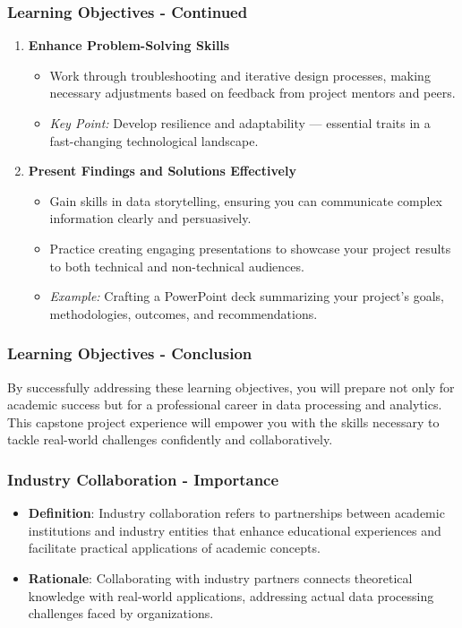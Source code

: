 \documentclass{beamer}
\begin{document}
\begin{frame}[fragile]
    \frametitle{Learning Objectives - Continued}
    \begin{enumerate}[resume]
        \item \textbf{Enhance Problem-Solving Skills}
            \begin{itemize}
                \item Work through troubleshooting and iterative design processes, making necessary adjustments based on feedback from project mentors and peers.
                \item \textit{Key Point:} Develop resilience and adaptability — essential traits in a fast-changing technological landscape.
            \end{itemize}
        \item \textbf{Present Findings and Solutions Effectively}
            \begin{itemize}
                \item Gain skills in data storytelling, ensuring you can communicate complex information clearly and persuasively.
                \item Practice creating engaging presentations to showcase your project results to both technical and non-technical audiences.
                \item \textit{Example:} Crafting a PowerPoint deck summarizing your project’s goals, methodologies, outcomes, and recommendations.
            \end{itemize}
    \end{enumerate}
\end{frame}

\begin{frame}[fragile]
    \frametitle{Learning Objectives - Conclusion}
    By successfully addressing these learning objectives, you will prepare not only for academic success but for a professional career in data processing and analytics. This capstone project experience will empower you with the skills necessary to tackle real-world challenges confidently and collaboratively.
\end{frame}

\begin{frame}[fragile]
    \frametitle{Industry Collaboration - Importance}
    \begin{itemize}
        \item \textbf{Definition}: Industry collaboration refers to partnerships between academic institutions and industry entities that enhance educational experiences and facilitate practical applications of academic concepts.
        
        \item \textbf{Rationale}: Collaborating with industry partners connects theoretical knowledge with real-world applications, addressing actual data processing challenges faced by organizations.
    \end{itemize}
\end{frame}
\end{document}
